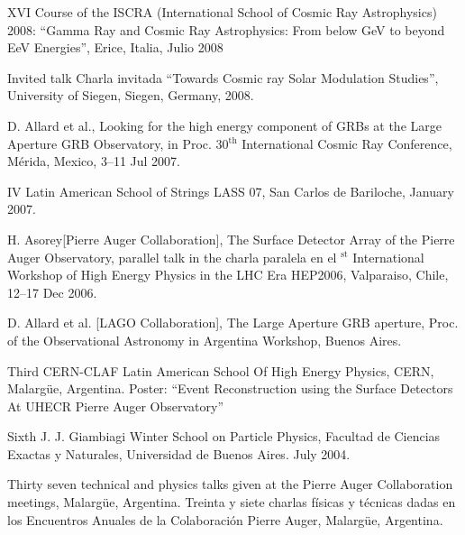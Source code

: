 \begin{etaremune}
\item {}XVI Course of the ISCRA (International School of Cosmic Ray Astrophysics) 2008: ``Gamma Ray and Cosmic Ray Astrophysics: From below GeV to beyond EeV Energies'', Erice, Italia, Julio 2008

\item {}\ifeng Invited talk \else Charla invitada \fi ``Towards Cosmic ray Solar Modulation Studies'', University of Siegen, Siegen, Germany, 2008.

\item {}D. Allard { et al.}, {{Looking for the high energy component of GRBs at the Large Aperture GRB Observatory}}, in Proc.
30$^{\mathrm{th}}$ International Cosmic Ray Conference,  Mérida, Mexico, 3--11 Jul 2007.

\item {}IV Latin American School of Strings LASS 07, San Carlos de Bariloche, January 2007.

\item {}H. Asorey[Pierre Auger Collaboration], {{The Surface Detector Array of the Pierre Auger Observatory}}, 
\ifeng
parallel talk in the 
\else
charla paralela en el 
$^{\mathrm{st}}$ International Workshop of High Energy Physics in the LHC Era HEP2006, Valparaiso, Chile, 12--17 Dec 2006.

\item {}D. Allard { et al.} [LAGO Collaboration], {{The Large Aperture GRB aperture}}, \en Proc.
of the Observational Astronomy in Argentina Workshop, Buenos Aires.

\item {}Third CERN-CLAF Latin American School Of High Energy Physics, CERN, Malargüe, Argentina.
Poster: ``Event Reconstruction using the Surface Detectors At UHECR Pierre Auger Observatory''

\item {}Sixth J. J. Giambiagi Winter School on Particle Physics, Facultad de Ciencias Exactas y Naturales, Universidad de Buenos Aires.
July 2004.

\item {} 
\ifeng
Thirty seven technical and physics talks given at the Pierre Auger Collaboration meetings, Malargüe, Argentina.
\else
Treinta y siete charlas físicas y técnicas dadas en los Encuentros Anuales de la Colaboración Pierre Auger, Malargüe, Argentina.
\fi
\end{etaremune}
